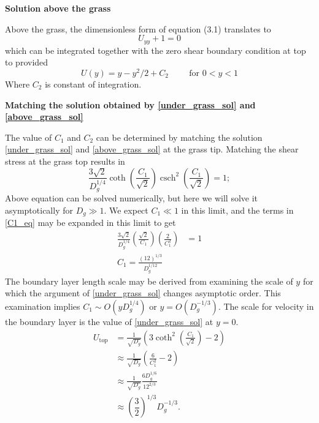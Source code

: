 \documentclass[12pt]{report}   %
\DeclareMathOperator{\csch}{csch}
\begin{document}
\vspace{2mm}
\noindent
\textbf{Solution above the grass}

\noindent
Above the grass, the dimensionless form of equation (3.1) translates to
\begin{equation}
 U_{yy}+1=0
\end{equation}
which can be integrated together with the zero shear boundary condition at top to provided
\begin{equation}
 U(y) = y-y^2/2+C_2 \hspace{1cm} \text{for $0<y<1$}
 \label{above_grass_sol}
\end{equation}
Where $C_2$ is constant of integration.

\vspace{2mm}
\noindent
\textbf{Matching the solution obtained by \eqref{under_grass_sol} and \eqref{above_grass_sol} }

\noindent
The value of $C_1$ and $C_2$ can be determined by matching the solution \eqref{under_grass_sol} and \eqref{above_grass_sol} at the grass tip.
Matching the shear stress at the grass top results in
\begin{equation}
\frac{3\sqrt{2}}{D_g^{1/4}} \coth\left(\frac{C_1}{\sqrt{2}}\right) \csch^2\left(\frac{C_1}{\sqrt{2}}\right) = 1;
\label{C1_eq}
\end{equation}
Above equation can be solved numerically, but here we will solve it asymptotically for $D_g \gg 1$. We expect $C_1 \ll 1$ in this limit, and the terms in \eqref{C1_eq} may be expanded in this limit to get
\begin{equation}
\begin{split}
\frac{3\sqrt{2}}{D_g^{1/4}} \left( \frac{\sqrt{2}}{C_1} \right) \left( \frac{2}{C_1^2} \right) &= 1 \\
C_1 = \frac{(12)^{1/3}}{D_g^{1/12}}
\end{split}
\end{equation}
The boundary layer length scale may be derived from examining the scale of $y$ for which the argument of \eqref{under_grass_sol} changes asymptotic order. This examination implies $C_1 \sim O(y D_g^{1/4})$ or $y = O(D_g^{-1/3})$. The scale for velocity in the boundary layer is the value of \eqref{under_grass_sol} at $y=0$.
\begin{align}
 U_\text{top} &=  \frac{1}{\sqrt{D_g}} \left( 3 \coth^2 \left(\frac{C_1}{\sqrt{2}}  \right)-2    \right) \\
              &\approx  \frac{1}{\sqrt{D_g}} \left( \frac{6}{C_1^2} -2    \right) \\
              &\approx \frac{1}{\sqrt{D_g}} \frac{6D_g^{1/6}}{12^{2/3}} \\
              &\approx \left( \dfrac{3}{2} \right)^{1/3} D_g^{-1/3}.
\end{align}
\end{document}

